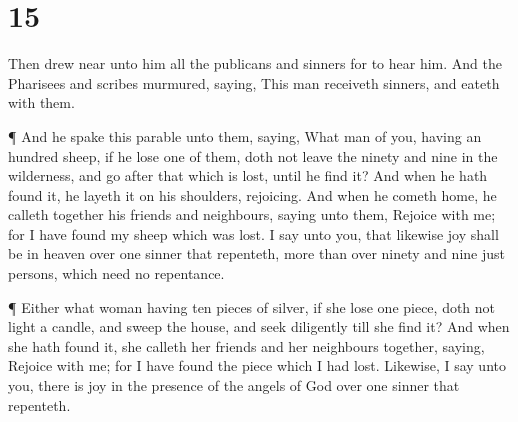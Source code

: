 \hypertarget{section-14}{%
\section{15}\label{section-14}}

 Then drew near unto him all the publicans and sinners for
to hear him.  And the Pharisees and scribes murmured,
saying, This man receiveth sinners, and eateth with them.

 ¶ And he spake this parable unto them, saying, 
What man of you, having an hundred sheep, if he lose one of them, doth
not leave the ninety and nine in the wilderness, and go after that which
is lost, until he find it?  And when he hath found it, he
layeth it on his shoulders, rejoicing.  And when he cometh
home, he calleth together his friends and neighbours, saying unto them,
Rejoice with me; for I have found my sheep which was lost. 
I say unto you, that likewise joy shall be in heaven over one sinner
that repenteth, more than over ninety and nine just persons, which need
no repentance.

 ¶ Either what woman having ten pieces of silver, if she
lose one piece, doth not light a candle, and sweep the house, and seek
diligently till she find it?  And when she hath found it,
she calleth her friends and her neighbours together, saying, Rejoice
with me; for I have found the piece which I had lost. 
Likewise, I say unto you, there is joy in the presence of the angels of
God over one sinner that repenteth.

